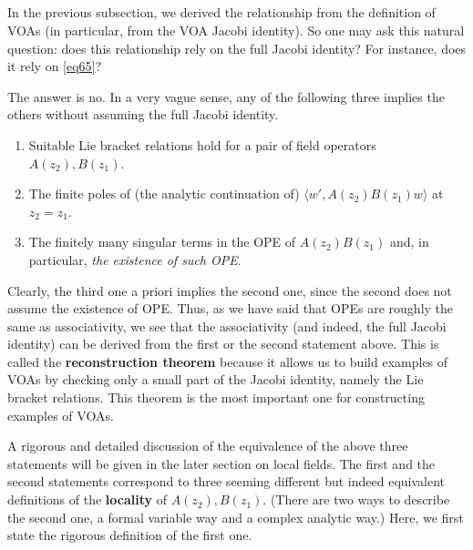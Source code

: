 \documentclass[12pt,a4paper,notitlepage]{article}
\theoremstyle{definition}
\theoremstyle{plain}
\newcommand{\bk}[1]{\langle {#1}\rangle}
\numberwithin{equation}{section}
\begin{document}
\subsection{}\label{lb57}

In the previous subsection, we derived the relationship from the definition of VOAs (in particular, from the VOA Jacobi identity). So one may ask this natural question: does this relationship rely on the full Jacobi identity? For instance, does it rely on \eqref{eq65}?

The answer is no. In a very vague sense, any of the following three implies the others without assuming the full Jacobi identity.
\begin{enumerate}
\item Suitable Lie bracket relations hold for a pair of field operators $A(z_2),B(z_1)$.
\item The finite poles of (the analytic continuation of) $\bk{w',A(z_2)B(z_1)w}$ at $z_2=z_1$.
\item The finitely many singular terms in the OPE of $A(z_2)B(z_1)$ and, in particular, \emph{the existence of such OPE}.
\end{enumerate}
Clearly, the third one a priori implies the second one, since the second does not assume the existence of OPE. Thus, as we have said that OPEs are roughly the same as associativity, we see that the associativity (and indeed, the full Jacobi identity) can be derived from the first or the second statement above. This is called the \textbf{reconstruction theorem} because it allows us to build examples of VOAs by checking only a small part of the Jacobi identity, namely the Lie bracket relations. This theorem is the most important one for constructing examples of VOAs.

A rigorous and detailed discussion of the equivalence of the above three statements will be given in the later section on local fields. The first and the second statements correspond to three seeming different but indeed equivalent definitions of the \textbf{locality} of $A(z_2),B(z_1)$. (There are two ways to describe the second one, a formal variable way and a complex analytic way.) Here, we first state the rigorous definition of the first one.



\subsection{}
\end{document}

